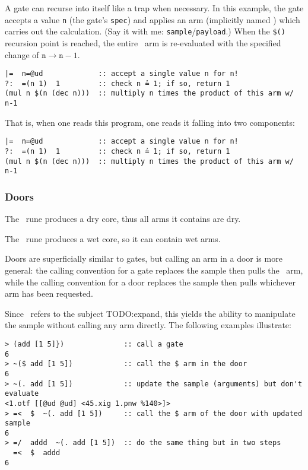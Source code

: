 A gate can recurse into itself like a trap when necessary.  In this example, the gate accepts a value \texttt{n} (the gate's \texttt{spec}) and applies an arm (implicitly named \buc) which carries out the calculation.  (Say it with me:  \texttt{sample}/\texttt{payload}.)  When the \texttt{\$()} recursion point is reached, the entire \buc~arm is re-evaluated with the specified change of $\texttt{n} \rightarrow \texttt{n} - 1$.

\begin{lstlisting}[language=hoon,
                   caption={Calculating a factorial using recursion.  (Example from Tlon documentation.)}]
|=  n=@ud             :: accept a single value n for n!
?:  =(n 1)  1         :: check n ≟ 1; if so, return 1
(mul n $(n (dec n)))  :: multiply n times the product of this arm w/ n-1
\end{lstlisting}

That is, when one reads this program, one reads it falling into two components:

\begin{lstlisting}[language=hoon,
                   style=nonumbers]
|=  n=@ud             :: accept a single value n for n!
?:  =(n 1)  1         :: check n ≟ 1; if so, return 1
(mul n $(n (dec n)))  :: multiply n times the product of this arm w/ n-1
\end{lstlisting}



\subsubsection{Doors}

\barcab

The \pbarcen~rune produces a dry core, thus all arms it contains are dry.

The \pbarpat~rune produces a wet core, so it can contain wet arms.

Doors are superficially similar to gates, but calling an arm in a door is more general:  the calling convention for a gate replaces the sample then pulls the \buc~arm, while the calling convention for a door replaces the sample then pulls whichever arm has been requested.

Since \dot~refers to the subject TODO:expand, this yields the ability to manipulate the sample without calling any arm directly.  The following examples illustrate:

\begin{lstlisting}[language=hoon,
                   style=nonumbers]
> (add [1 5]})              :: call a gate
6
> ~($ add [1 5])            :: call the $ arm in the door
6
> ~(. add [1 5])            :: update the sample (arguments) but don't evaluate
<1.otf [[@ud @ud] <45.xig 1.pnw %140>]>
> =<  $  ~(. add [1 5])     :: call the $ arm of the door with updated sample
6
> =/  addd  ~(. add [1 5])  :: do the same thing but in two steps
  =<  $  addd
6
\end{lstlisting}


